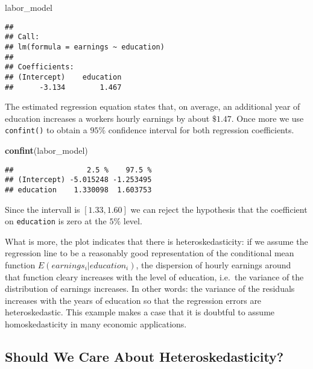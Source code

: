 \documentclass[]{book}
\newenvironment{Shaded}{\begin{snugshade}}{\end{snugshade}}
\newcommand{\KeywordTok}[1]{\textcolor[rgb]{0.13,0.29,0.53}{\textbf{#1}}}
\newcommand{\NormalTok}[1]{#1}
\theoremstyle{definition}
\theoremstyle{definition}
\theoremstyle{definition}
\theoremstyle{remark}
\begin{document}
\begin{Shaded}
\begin{Highlighting}[]
\NormalTok{labor_model}
\end{Highlighting}
\end{Shaded}

\begin{verbatim}
## 
## Call:
## lm(formula = earnings ~ education)
## 
## Coefficients:
## (Intercept)    education  
##      -3.134        1.467
\end{verbatim}

The estimated regression equation states that, on average, an additional
year of education increases a workers hourly earnings by about
\(\$ 1.47\). Once more we use \texttt{confint()} to obtain a \(95\%\)
confidence interval for both regression coefficients.

\begin{Shaded}
\begin{Highlighting}[]
\KeywordTok{confint}\NormalTok{(labor_model)}
\end{Highlighting}
\end{Shaded}

\begin{verbatim}
##                 2.5 %    97.5 %
## (Intercept) -5.015248 -1.253495
## education    1.330098  1.603753
\end{verbatim}

Since the intervall is \([1.33, 1.60]\) we can reject the hypothesis
that the coefficient on \texttt{education} is zero at the \(5\%\) level.

What is more, the plot indicates that there is heteroskedasticity: if we
assume the regression line to be a reasonably good representation of the
conditional mean function \(E(earnings_i\vert education_i)\), the
dispersion of hourly earnings around that function cleary increases with
the level of education, i.e.~the variance of the distribution of
earnings increases. In other words: the variance of the residuals
increases with the years of education so that the regression errors are
heteroskedastic. This example makes a case that it is doubtful to assume
homoskedasticity in many economic applications.

\subsection*{Should We Care About
Heteroskedasticity?}\label{should-we-care-about-heteroskedasticity}
\end{document}
